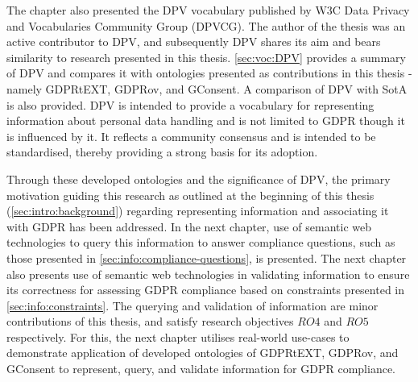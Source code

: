 The chapter also presented the DPV vocabulary published by W3C Data Privacy and Vocabularies Community Group (DPVCG). The author of the thesis was an active contributor to DPV, and subsequently DPV shares its aim and bears similarity to research presented in this thesis. \autoref{sec:voc:DPV} provides a summary of DPV and compares it with ontologies presented as contributions in this thesis - namely GDPRtEXT, GDPRov, and GConsent. A comparison of DPV with SotA is also provided.
DPV is intended to provide a vocabulary for representing information about personal data handling and is not limited to GDPR though it is influenced by it. It reflects a community consensus and is intended to be standardised, thereby providing a strong basis for its adoption.

Through these developed ontologies and the significance of DPV, the primary motivation guiding this research as outlined at the beginning of this thesis (\autoref{sec:intro:background}) regarding representing information and associating it with GDPR has been addressed.
In the next chapter, use of semantic web technologies to query this information to answer compliance questions, such as those presented in \autoref{sec:info:compliance-questions}, is presented. The next chapter also presents use of semantic web technologies in validating information to ensure its correctness for assessing GDPR compliance based on constraints presented in \autoref{sec:info:constraints}.
The querying and validation of information are minor contributions of this thesis, and satisfy research objectives $RO4$ and $RO5$ respectively.
For this, the next chapter utilises real-world use-cases to demonstrate application of  developed ontologies of GDPRtEXT, GDPRov, and GConsent to represent, query, and validate information for GDPR compliance.
